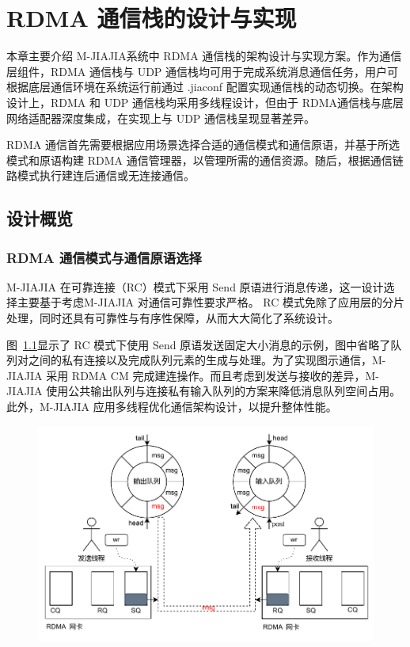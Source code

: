 \chapter{RDMA 通信栈的设计与实现}\label{chap:RDMA}{
    本章主要介绍 M-JIAJIA系统中 RDMA 通信栈的架构设计与实现方案。作为通信层组件，RDMA 通信栈与 UDP 通信栈均可用于完成系统消息通信任务，用户可根据底层通信环境在系统运行前通过 .jiaconf 配置实现通信栈的动态切换。在架构设计上，RDMA 和 UDP 通信栈均采用多线程设计，但由于 RDMA通信栈与底层网络适配器深度集成，在实现上与 UDP 通信栈呈现显著差异。

    RDMA 通信首先需要根据应用场景选择合适的通信模式和通信原语，并基于所选模式和原语构建 RDMA 通信管理器，以管理所需的通信资源。随后，根据通信链路模式执行建连后通信或无连接通信。

    \section{设计概览}\label{sec:设计概览}

    \subsection{RDMA 通信模式与通信原语选择}

    M-JIAJIA 在可靠连接（RC）模式下采用 Send 原语进行消息传递，这一设计选择主要基于考虑M-JIAJIA 对通信可靠性要求严格。
    RC 模式免除了应用层的分片处理，同时还具有可靠性与有序性保障，从而大大简化了系统设计。

    图~\ref{fig:mjiajia-send-recv}显示了 RC 模式下使用 Send 原语发送固定大小消息的示例，图中省略了队列对之间的私有连接以及完成队列元素的生成与处理。为了实现图示通信，M-JIAJIA 采用 RDMA CM 完成建连操作。而且考虑到发送与接收的差异，M-JIAJIA 使用公共输出队列与连接私有输入队列的方案来降低消息队列空间占用。此外，M-JIAJIA 应用多线程优化通信架构设计，以提升整体性能。
    \begin{figure}[H]
        \centering
        \includegraphics[width=\textwidth]{Img/RDMA通信栈可靠链接.drawio.pdf}
        \label{fig:mjiajia-send-recv}
    \end{figure}



}
